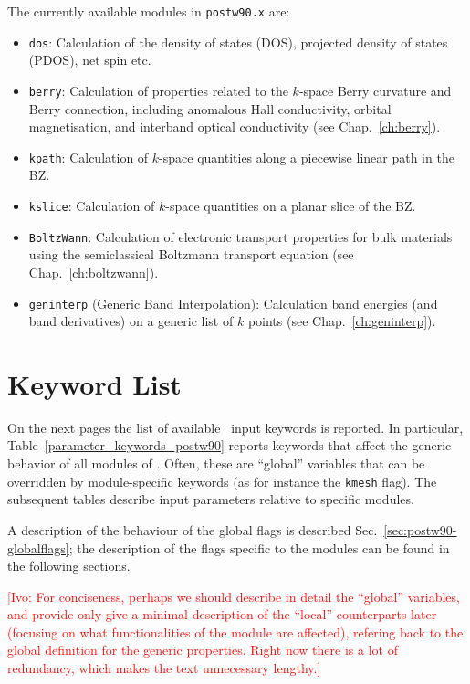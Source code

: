 The currently available modules in \texttt{postw90.x} are:
\begin{itemize}
\item \texttt{dos}: Calculation of the density of states (DOS), projected
  density of states (PDOS), net spin etc.
\item \texttt{berry}: Calculation of properties related to the
  $k$-space Berry curvature and Berry connection, including anomalous
  Hall conductivity, orbital magnetisation, and interband optical
  conductivity (see Chap.~\ref{ch:berry}).
\item \texttt{kpath}: Calculation of $k$-space quantities along a
  piecewise linear path in the BZ.
\item \texttt{kslice}: Calculation of $k$-space quantities on a planar
  slice of the BZ.
\item \texttt{BoltzWann}: Calculation of electronic transport
  properties for bulk materials using the semiclassical Boltzmann transport equation (see Chap.~\ref{ch:boltzwann}).
\item \texttt{geninterp} (Generic Band Interpolation): Calculation band energies (and band
  derivatives) on a generic list of $k$ points (see Chap.~\ref{ch:geninterp}).
\end{itemize}


\section{Keyword List}
On the next pages the list of available
\postw\ input keywords is reported.
In particular, Table~\ref{parameter_keywords_postw90} reports keywords
that affect the generic behavior of all modules of
\postw. Often, these are ``global'' variables that can be overridden
by module-specific keywords (as for instance the {\tt kmesh}
flag). The subsequent tables describe input parameters relative to
specific modules. 

A description of the behaviour of the global flags is described
Sec.~\ref{sec:postw90-globalflags}; the description of the flags
specific to the modules can be found
in the following sections.

\textcolor{red}{[Ivo: For conciseness, perhaps we should describe in
  detail the ``global'' variables, and provide only give a minimal
  description of the ``local'' counterparts later (focusing on what
  functionalities of the module are affected), refering back to the
  global definition for the generic properties. Right now there is a
  lot of redundancy, which makes the text unnecessary lengthy.]}

